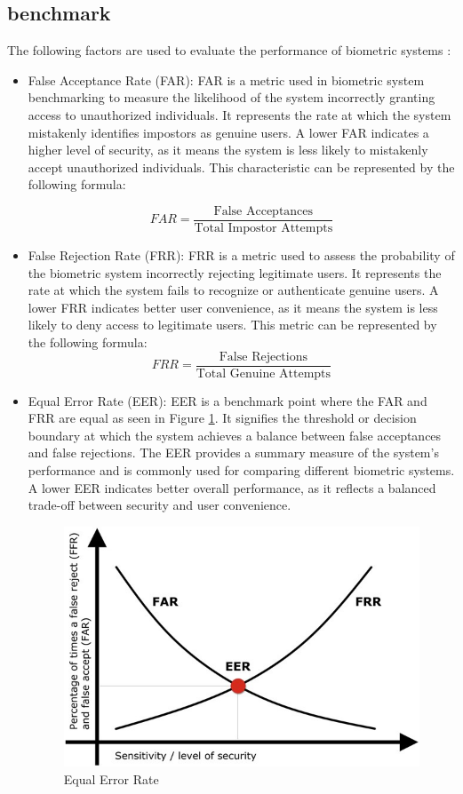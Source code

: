 \subsection{benchmark}

The following factors are used to evaluate the performance of biometric systems \cite{benchmarks}:

\begin{itemize}
	\item False Acceptance Rate (FAR):
	FAR is a metric used in biometric system benchmarking to measure the likelihood of the system incorrectly granting access to unauthorized individuals. It represents the rate at which the system mistakenly identifies impostors as genuine users. A lower FAR indicates a higher level of security, as it means the system is less likely to mistakenly accept unauthorized individuals. This characteristic can be represented by the following formula:

	\begin{equation}
		FAR = \frac{\text{False Acceptances}}{\text{Total Impostor Attempts}}
		\label{eq:far}
	\end{equation}
	
	\item False Rejection Rate (FRR):
	FRR is a metric used to assess the probability of the biometric system incorrectly rejecting legitimate users. It represents the rate at which the system fails to recognize or authenticate genuine users. A lower FRR indicates better user convenience, as it means the system is less likely to deny access to legitimate users. This metric can be represented by the following formula:
	\begin{equation}
		FRR = \frac{\text{False Rejections}}{\text{Total Genuine Attempts}}
		\label{eq:frr}
	\end{equation}
	
	\item Equal Error Rate (EER):
	EER is a benchmark point where the FAR and FRR are equal as seen in Figure \ref{fig:eer}. It signifies the threshold or decision boundary at which the system achieves a balance between false acceptances and false rejections. The EER provides a summary measure of the system's performance and is commonly used for comparing different biometric systems. A lower EER indicates better overall performance, as it reflects a balanced trade-off between security and user convenience.
	\begin{figure}[h]
	    \centering
	    \includegraphics[width=0.7\linewidth]{images/eer}
	    \caption{Equal Error Rate \cite{eer}}
	    \label{fig:eer}
	\end{figure}
\end{itemize}